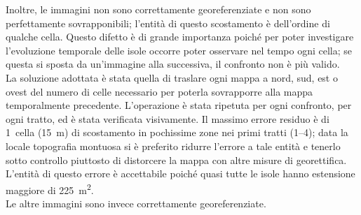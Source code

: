 Inoltre, le immagini \AST{} non sono correttamente georeferenziate e non sono perfettamente sovrapponibili; l'entità di questo scostamento è dell'ordine di qualche cella.
Questo difetto è di grande importanza poiché per poter investigare l'evoluzione temporale delle isole occorre poter osservare nel tempo ogni cella; se questa si sposta da un'immagine alla successiva, il confronto non è più valido.
\\
La soluzione adottata è stata quella di traslare ogni mappa a nord, sud, est o ovest del numero di celle necessario per poterla sovrapporre alla mappa temporalmente precedente.
L'operazione è stata ripetuta per ogni confronto, per ogni tratto, ed è stata verificata visivamente.
Il massimo errore residuo è di 1~cella (\SI{15}{\m}) di scostamento in pochissime zone nei primi tratti (\numrange[range-phrase={ - }]{1}{4}); data la locale topografia montuosa si è preferito ridurre l'errore a tale entità e tenerlo sotto controllo piuttosto di distorcere la mappa con altre misure di georettifica.
L'entità di questo errore è accettabile poiché quasi tutte le isole hanno estensione maggiore di \SI{225}{\m\tothe{2}}.
\\
Le altre immagini sono invece correttamente georeferenziate.

